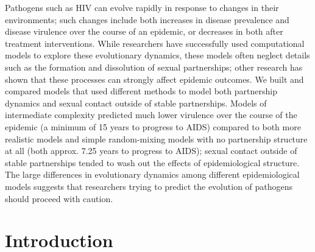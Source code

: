 \documentclass[10pt,letterpaper]{article}
\begin{document}

Pathogens such as HIV can evolve rapidly in response to changes in
their environments; such changes include both increases in disease
prevalence and disease virulence over the course of an epidemic, or
decreases in both after treatment interventions. While researchers
have successfully used computational models to explore these
evolutionary dynamics, these models often neglect details such as the
formation and dissolution of sexual partnerships; other research has
shown that these processes can strongly affect epidemic outcomes. We
built and compared models that used different methods to model both
partnership dynamics and sexual contact outside of stable
partnerships. Models of intermediate complexity predicted much lower
virulence over the course of the epidemic (a minimum of 15 years to
progress to AIDS) compared to both more realistic models and simple
random-mixing models with no partnership structure at all (both
approx. 7.25 years to progress to AIDS); sexual contact outside of
stable partnerships tended to wash out the effects of epidemiological
structure. The large differences in evolutionary dynamics among
different epidemiological models suggests that researchers trying to
predict the evolution of pathogens should proceed with caution.

\linenumbers

\section*{Introduction}
\end{document}
